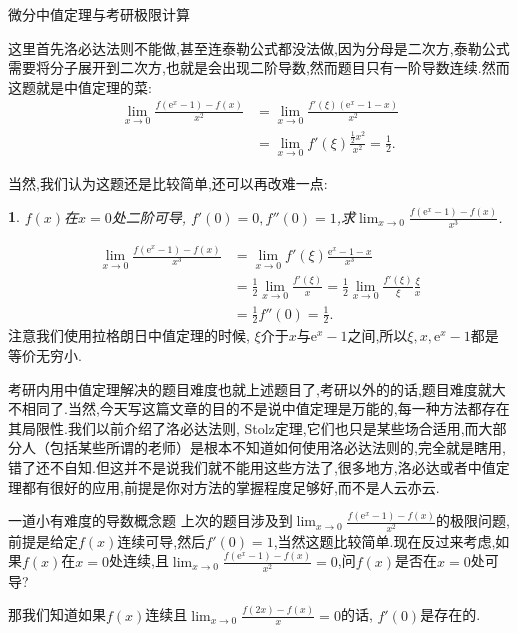 \documentclass[UTF8,no-math,12pt,openany,table,dvipsnames,svgnames]{book}
\newcommand{\ee}{\mathrm e}
\newcommand{\hei}{\CJKfamily{hei}}
\newenvironment{solve}{\par\indent{\hei 解}\hspace{1em}}{\par}
\newtheorem{example}{}
\begin{document}
\begin{MYBOX}[colbacktitle=green]{微分中值定理与考研极限计算}
\begin{solve}
这里首先洛必达法则不能做,甚至连泰勒公式都没法做,因为分母是二次方,泰勒公式需要将分子展开到二次方,也就是会出现二阶导数,然而题目只有一阶导数连续.然而这题就是中值定理的菜:
\begin{align*}
\lim_{x\to0}\frac{f(\mathrm e^x-1)-f(x)}{x^2}&=\lim_{x\to0}\frac{f'(\xi)(\mathrm e^x-1-x)}{x^2}\\
&=\lim_{x\to0}f'(\xi)\frac{\frac12x^2}{x^2}=\frac12.
\end{align*}
\end{solve}
当然,我们认为这题还是比较简单,还可以再改难一点:
\begin{example}
$f(x)$在$x=0$处二阶可导, $f'(0)=0,f''(0)=1$,求$\lim_{x\to0}\frac{f(\mathrm e^x-1)-f(x)}{x^3}$.
\end{example}
\begin{solve}
\begin{align*}
\lim_{x\to0}\frac{f(\mathrm e^x-1)-f(x)}{x^3}&=\lim_{x\to0}f'(\xi)\frac{\mathrm e^x-1-x}{x^3}\\
&=\frac12\lim_{x\to0}\frac{f'(\xi)}{x}=\frac12\lim_{x\to0}\frac{f'(\xi)}{\xi}\frac{\xi}x\\
&=\frac12f''(0)=\frac12.
\end{align*}
注意我们使用拉格朗日中值定理的时候, $\xi$介于$x$与$\mathrm e^x-1$之间,所以$\xi,x,\mathrm e^x-1$都是等价无穷小.
\end{solve}
考研内用中值定理解决的题目难度也就上述题目了,考研以外的的话,题目难度就大不相同了.当然,今天写这篇文章的目的不是说中值定理是万能的,每一种方法都存在其局限性.我们以前介绍了洛必达法则, Stolz定理,它们也只是某些场合适用,而大部分人（包括某些所谓的老师）是根本不知道如何使用洛必达法则的,完全就是瞎用,错了还不自知.但这并不是说我们就不能用这些方法了,很多地方,洛必达或者中值定理都有很好的应用,前提是你对方法的掌握程度足够好,而不是人云亦云.
\end{MYBOX}
\begin{MYBOX}[colbacktitle=blue]{一道小有难度的导数概念题}
上次的题目涉及到$\lim_{x\to0}\frac{f(\ee^x-1)-f(x)}{x^2}$的极限问题,前提是给定$f(x)$连续可导,然后$f'(0)=1$,当然这题比较简单.现在反过来考虑,如果$f(x)$在$x=0$处连续,且$\lim_{x\to0}\frac{f(\ee^x-1)-f(x)}{x^2}=0$,问$f(x)$是否在$x=0$处可导?

那我们知道如果$f(x)$连续且$\lim_{x\to0}\frac{f(2x)-f(x)}x=0$的话, $f'(0)$是存在的.
\end{MYBOX}
\setcounter{example}{0}
\end{document}
